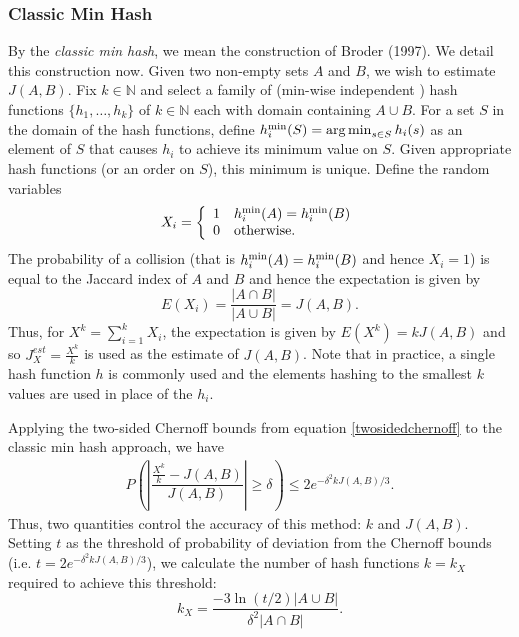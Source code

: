 \documentclass[11pt,reqno]{amsart}
\theoremstyle{remark}
\numberwithin{equation}{section}
\DeclareMathOperator*{\argmin}{arg\,min}
\newcommand{\classicX}{X}
\begin{document}
\subsubsection{Classic Min Hash}
By the \textit{classic min hash}, we mean the construction of Broder (1997). We detail this construction now. Given two non-empty sets $A$ and $B$, we wish to estimate $J(A,B)$. Fix $k\in \mathbb{N}$ and select a family of (min-wise independent \cite{broder2000min}) hash functions $\{h_1,\dots, h_k\}$ of $k\in \mathbb{N}$ each with domain containing $A\cup B$. For a set $S$ in the domain of the hash functions, define $h^{\rm min}_i(S)=\argmin_{s\in S} h_i(s)$ as an element of $S$ that causes $h_i$ to achieve its minimum value on $S$. Given appropriate hash functions (or an order on $S$), this minimum is unique. Define the random variables
$$\classicX_i=\left\{
\begin{array}{lll}
1 &h_i^{\rm min}(A)=h_i^{\rm min}(B)\\
0& {\rm otherwise}.
\end{array}
\right.$$
The probability of a collision (that is $h_i^{\rm min}(A)=h_i^{\rm min}(B)$ and hence $\classicX_i=1$) is equal to the Jaccard index of $A$ and $B$ \cite{broder2000min} and hence the expectation is given by
$$E(\classicX_i)= \dfrac{|A\cap B|}{|A\cup B|}=J(A,B).$$
Thus, for 
$\classicX^k=\sum\limits_{i=1}^k \classicX_i$,
the expectation is given by $E(\classicX^k)=k J(A,B)$ and so $J^{est}_X = \frac{\classicX^k}{k}$ is used as the estimate of $J(A,B)$. Note that in practice, a single hash function $h$ is commonly used and the elements hashing to the smallest $k$ values are used in place of the $h_i$.

Applying the two-sided Chernoff bounds from equation \eqref{twosidedchernoff} to the classic min hash approach, we have
\begin{align}
\label{eqn:ClassicChernoff}
P\left( \left|\dfrac{\frac{X^k}{k}-J(A,B)}{J(A,B)}\right|\geq\delta\right)\leq 2e^{-\delta^2kJ(A,B)/3}.
\end{align}
Thus, two quantities control the accuracy of this method: $k$ and $J(A,B)$. Setting $t$ as the threshold of probability of deviation from the Chernoff bounds (i.e. $t=2e^{-\delta^2k J(A,B)/3}$), we calculate the number of hash functions $k=k_\classicX$ required to achieve this threshold:
\begin{equation}
\label{eqn:Jaccardhashes}
k_\classicX=\dfrac{-3\ln(t/2)|A\cup B|}{\delta^2 |A\cap B|}.
\end{equation}
\end{document}
